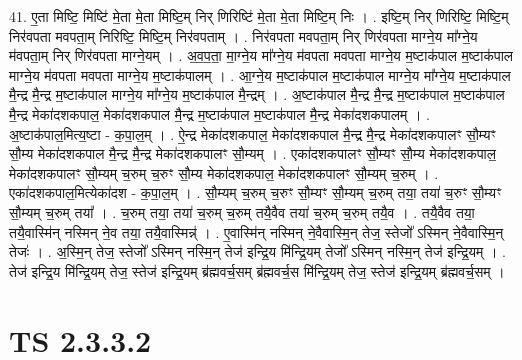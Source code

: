 \documentclass[17pt]{extarticle}
\begin{document}
41. ए॒ता मिष्टि॒ मिष्टि॑ मे॒ता मे॒ता मिष्टि॒म् निर् णिरिष्टि॑ मे॒ता मे॒ता मिष्टि॒म् निः । . इष्टि॒म् निर् णिरिष्टि॒ मिष्टि॒म् निर॑वपता मवपता॒म् निरिष्टि॒ मिष्टि॒म् निर॑वपताम् । . निर॑वपता मवपता॒म् निर् णिर॑वपता माग्ने॒य मा᳚ग्ने॒य म॑वपता॒म् निर् णिर॑वपता माग्ने॒यम् । . अ॒व॒प॒ता॒ मा॒ग्ने॒य मा᳚ग्ने॒य म॑वपता मवपता माग्ने॒य म॒ष्टाक॑पाल म॒ष्टाक॑पाल माग्ने॒य म॑वपता मवपता माग्ने॒य म॒ष्टाक॑पालम् । . आ॒ग्ने॒य म॒ष्टाक॑पाल म॒ष्टाक॑पाल माग्ने॒य मा᳚ग्ने॒य म॒ष्टाक॑पाल मै॒न्द्र मै॒न्द्र म॒ष्टाक॑पाल माग्ने॒य मा᳚ग्ने॒य म॒ष्टाक॑पाल मै॒न्द्रम् । . अ॒ष्टाक॑पाल मै॒न्द्र मै॒न्द्र म॒ष्टाक॑पाल म॒ष्टाक॑पाल मै॒न्द्र मेका॑दशकपाल॒ मेका॑दशकपाल मै॒न्द्र म॒ष्टाक॑पाल म॒ष्टाक॑पाल मै॒न्द्र मेका॑दशकपालम् । . अ॒ष्टाक॑पाल॒मित्य॒ष्टा - क॒पा॒ल॒म् । . ऐ॒न्द्र मेका॑दशकपाल॒ मेका॑दशकपाल मै॒न्द्र मै॒न्द्र मेका॑दशकपालꣳ सौ॒म्यꣳ सौ॒म्य मेका॑दशकपाल मै॒न्द्र मै॒न्द्र मेका॑दशकपालꣳ सौ॒म्यम् । . एका॑दशकपालꣳ सौ॒म्यꣳ सौ॒म्य मेका॑दशकपाल॒ मेका॑दशकपालꣳ सौ॒म्यम् च॒रुम् च॒रुꣳ सौ॒म्य मेका॑दशकपाल॒ मेका॑दशकपालꣳ सौ॒म्यम् च॒रुम् । . एका॑दशकपाल॒मित्येका॑दश - क॒पा॒ल॒म् । . सौ॒म्यम् च॒रुम् च॒रुꣳ सौ॒म्यꣳ सौ॒म्यम् च॒रुम् तया॒ तया॑ च॒रुꣳ सौ॒म्यꣳ सौ॒म्यम् च॒रुम् तया᳚ । . च॒रुम् तया॒ तया॑ च॒रुम् च॒रुम् तयै॒वैव तया॑ च॒रुम् च॒रुम् तयै॒व । . तयै॒वैव तया॒ तयै॒वास्मि॑न् नस्मिन् ने॒व तया॒ तयै॒वास्मिन्न्॑ । . ए॒वास्मि॑न् नस्मिन् ने॒वैवास्मि॒न् तेज॒ स्तेजो᳚ ऽस्मिन् ने॒वैवास्मि॒न् तेजः॑ । . अ॒स्मि॒न् तेज॒ स्तेजो᳚ ऽस्मिन् नस्मि॒न् तेज॑ इन्द्रि॒य मि॑न्द्रि॒यम् तेजो᳚ ऽस्मिन् नस्मि॒न् तेज॑ इन्द्रि॒यम् । . तेज॑ इन्द्रि॒य मि॑न्द्रि॒यम् तेज॒ स्तेज॑ इन्द्रि॒यम् ब्र॑ह्मवर्च॒सम् ब्र॑ह्मवर्च॒स मि॑न्द्रि॒यम् तेज॒ स्तेज॑ इन्द्रि॒यम् ब्र॑ह्मवर्च॒सम् । \newline
\pagebreak
{}
\section*{ TS 2.3.3.2 }
\end{document}
